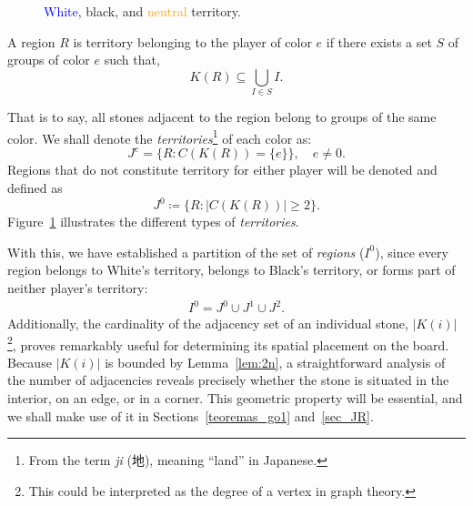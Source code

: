 \begin{figure}
	\caption{\textcolor{Blue}{White}, \textcolor{OliveGreen}{black}, and \textcolor{Orange}{neutral} territory.}
	\label{fig:territorios}
\end{figure}\begin{definition}[Territory]
	A region \(R\) is territory belonging to the player of color \(e\) if there exists a set \(S\) of groups of color \(e\) such that,
	\[K(R) \subseteq \bigcup_{I\in S} I.\]
\end{definition} That is to say, all stones adjacent to the region belong to groups of the same color. We shall denote the \textit{territories}\footnote{From the term \textit{ji} (地), meaning ``land'' in Japanese.} of each color as:
$$J^{e} = \{R : C(K(R)) = \{e\}\}, \quad e \neq 0.$$
Regions that do not constitute territory for either player will be denoted and defined as
$$J^{0}\coloneqq \{R : |C(K(R))| \geq 2\}.$$
Figure~\ref{fig:territorios} illustrates the different types of \textit{territories}.


With this, we have established a partition of the set of \textit{regions} ($I^{0}$), since every region belongs to White's territory, belongs to Black's territory, or forms part of neither player's territory:
\begin{align*}
	I^{0} = J^{0} \cup J^{1} \cup J^{2}.
\end{align*}
\label{posicion_espacial}
Additionally, the cardinality of the adjacency set of an individual stone, $|K(i)|$\footnote{This could be interpreted as the degree of a vertex in graph theory.}, proves remarkably useful for determining its spatial placement on the board. Because $|K(i)|$ is bounded by Lemma~\ref{lem:2n}, a straightforward analysis of the number of adjacencies reveals precisely whether the stone is situated in the interior, on an edge, or in a corner. This geometric property will be essential, and we shall make use of it in Sections~\ref{teoremas_go1} and~\ref{sec_JR}.

